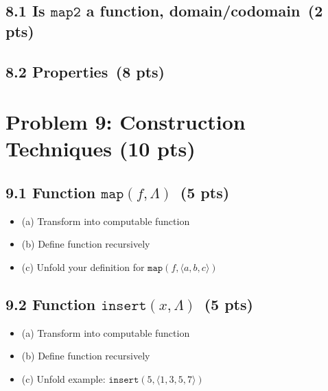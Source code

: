 \documentclass[11pt]{article}
\begin{document}
\subsection*{8.1 Is \(\texttt{map2}\) a function, domain/codomain \,(2 pts)}

\subsection*{8.2 Properties \,(8 pts)}

\newpage
\section{Problem 9: Construction Techniques (10 pts)}

\subsection*{9.1 Function \(\texttt{map}(f,\Lambda)\) \,(5 pts)}
\begin{itemize}
    \item (a) Transform into computable function
    \item (b) Define function recursively
    \item (c) Unfold your definition for \(\texttt{map}(f,\langle a,b,c\rangle)\)
\end{itemize}

\subsection*{9.2 Function \(\texttt{insert}(x,\Lambda)\) \,(5 pts)}
\begin{itemize}
    \item (a) Transform into computable function
    \item (b) Define function recursively
    \item (c) Unfold example: \(\texttt{insert}(5,\langle 1,3,5,7\rangle)\)
\end{itemize}

\newpage
\end{document}
